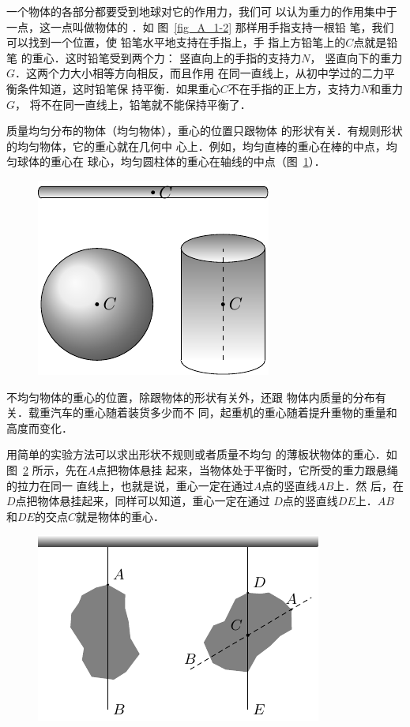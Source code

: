     一个物体的各部分都要受到地球对它的作用力，我们可
以认为重力的作用集中于一点，这一点叫做物体的 ．如
图~\ref{fig_A_1-2} 那样用手指支持一根铅
笔，我们可以找到一个位置，使
铅笔水平地支持在手指上，手
指上方铅笔上的$C$点就是铅笔
的重心．这时铅笔受到两个力：
竖直向上的手指的支持力$N$，
竖直向下的重力$G$．这两个力大小相等方向相反，而且作用
在同一直线上，从初中学过的二力平衡条件知道，这时铅笔保
持平衡．如果重心$C$不在手指的正上方，支持力$N$和重力$G$，
将不在同一直线上，铅笔就不能保持平衡了．


    质量均匀分布的物体（均匀物体），重心的位置只跟物体
的形状有关．有规则形状的均匀物体，它的重心就在几何中
心上．例如，均匀直棒的重心在棒的中点，均匀球体的重心在
球心，均匀圆柱体的重心在轴线的中点（图~\ref{fig_A_1-3}）．

\begin{figure}[htbp]
    \centering
    \includegraphics{fig/A/1-3.pdf} 
    \caption{} \label{fig_A_1-3} 
\end{figure} 

    不均匀物体的重心的位置，除跟物体的形状有关外，还跟
物体内质量的分布有关．载重汽车的重心随着装货多少而不
同，起重机的重心随着提升重物的重量和高度而变化．

    用简单的实验方法可以求出形状不规则或者质量不均匀
的薄板状物体的重心．如图~\ref{fig_A_1-4} 所示，先在$A$点把物体悬挂
起来，当物体处于平衡时，它所受的重力跟悬绳的拉力在同一
直线上，也就是说，重心一定在通过$A$点的竖直线$AB$上．然
后，在$D$点把物体悬挂起来，同样可以知道，重心一定在通过
$D$点的竖直线$DE$上．$AB$和$DE$的交点$C$就是物体的重心．


\begin{figure}[htbp]
    \centering
    \includegraphics{fig/A/1-4.pdf} 
    \caption{} \label{fig_A_1-4} 
\end{figure} 

